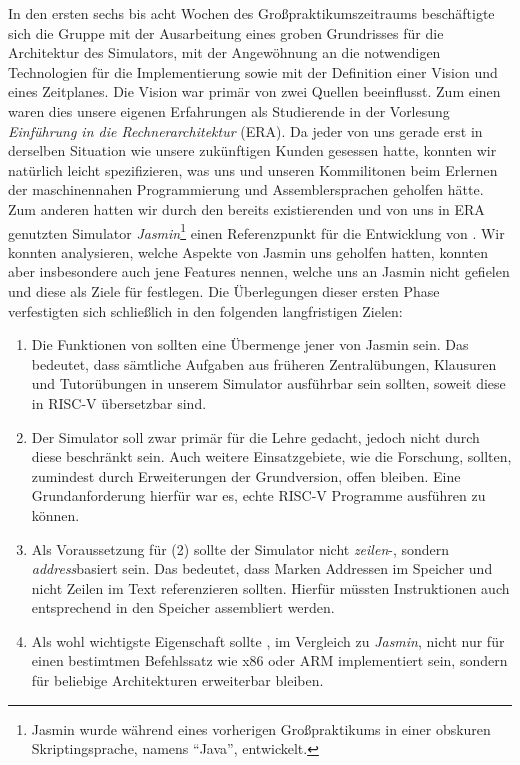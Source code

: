 In den ersten sechs bis acht Wochen des Großpraktikumszeitraums beschäftigte
sich die Gruppe mit der Ausarbeitung eines groben Grundrisses für die
Architektur des Simulators, mit der Angewöhnung an die notwendigen Technologien
für die Implementierung sowie mit der Definition einer Vision und eines
Zeitplanes. Die Vision war primär von zwei Quellen beeinflusst. Zum einen waren
dies unsere eigenen Erfahrungen als Studierende in der Vorlesung
\emph{Einführung in die Rechnerarchitektur} (ERA). Da jeder von uns gerade erst
in derselben Situation wie unsere zukünftigen Kunden gesessen hatte, konnten wir
natürlich leicht spezifizieren, was uns und unseren Kommilitonen beim Erlernen
der maschinennahen Programmierung und Assemblersprachen geholfen hätte. Zum
anderen hatten wir durch den bereits existierenden und von uns in ERA genutzten
Simulator \emph{Jasmin}\footnote{Jasmin wurde während eines vorherigen
Großpraktikums in einer obskuren Skriptingsprache, namens ``Java'', entwickelt.}
einen Referenzpunkt für die Entwicklung von \erasim{}. Wir konnten analysieren,
welche Aspekte von Jasmin uns geholfen hatten, konnten aber insbesondere auch
jene Features nennen, welche uns an Jasmin nicht gefielen und diese als Ziele
für \erasim{} festlegen. Die Überlegungen dieser ersten Phase verfestigten sich
schließlich in den folgenden langfristigen Zielen:

\begin{enumerate}
  \item Die Funktionen von \erasim{} sollten eine Übermenge jener von Jasmin
  sein. Das bedeutet, dass sämtliche Aufgaben aus früheren Zentralübungen,
  Klausuren und Tutorübungen in unserem Simulator ausführbar sein sollten,
  soweit diese in RISC-V übersetzbar sind.
  \item Der Simulator soll zwar primär für die Lehre gedacht, jedoch nicht durch
  diese beschränkt sein. Auch weitere Einsatzgebiete, wie die Forschung,
  sollten, zumindest durch Erweiterungen der Grundversion, offen bleiben. Eine
  Grundanforderung hierfür war es, echte RISC-V Programme ausführen zu können.
  \item Als Voraussetzung für (2) sollte der Simulator nicht \emph{zeilen}-,
  sondern \emph{address}basiert sein. Das bedeutet, dass Marken Addressen im
  Speicher und nicht Zeilen im Text referenzieren sollten. Hierfür müssten
  Instruktionen auch entsprechend in den Speicher assembliert werden.
  \item Als wohl wichtigste Eigenschaft sollte \erasim{}, im Vergleich zu
  \emph{Jasmin}, nicht nur für einen bestimtmen Befehlssatz wie x86 oder ARM
  implementiert sein, sondern für beliebige Architekturen erweiterbar bleiben.
\end{enumerate}

